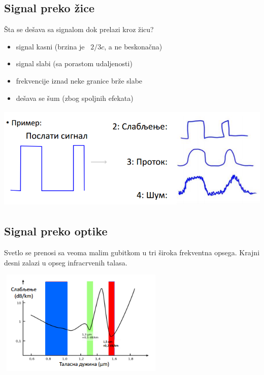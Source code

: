 \documentclass{article} %
\begin{document}
\subsection{Signal preko žice}
Šta se dešava sa signalom dok prelazi kroz žicu?
\begin{itemize}
  \item signal kasni (brzina je ~$2/3c$, a ne beskonačna)
  \item signal slabi (sa porastom udaljenosti)
  \item frekvencije iznad neke granice brže slabe
  \item dešava se šum (zbog spoljnih efekata)
\end{itemize}
\begin{center}
\includegraphics[width=15cm, height=5cm]{protok1}\\
\end{center}

\subsection{Signal preko optike}
Svetlo se prenosi sa veoma malim gubitkom u tri široka frekventna opsega. Krajni desni zalazi u opseg infracrvenih talasa.
\begin{center}
\includegraphics[width=8cm, height=5cm]{protok2}\\
\end{center}
\end{document}
